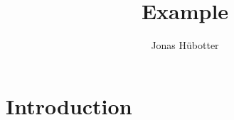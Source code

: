 \documentclass{article}
\title{Example}
\author{Jonas Hübotter}
\date
\begin{document}
\maketitle

\section{Introduction}
\end{document}
